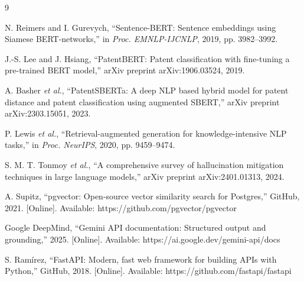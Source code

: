 \documentclass[journal]{IEEEtran}
\begin{document}
\begin{thebibliography}{9}

N. Reimers and I. Gurevych, ``Sentence-BERT: Sentence embeddings using Siamese BERT-networks,'' in \emph{Proc. EMNLP-IJCNLP}, 2019, pp. 3982--3992.

J.-S. Lee and J. Hsiang, ``PatentBERT: Patent classification with fine-tuning a pre-trained BERT model,'' arXiv preprint arXiv:1906.03524, 2019.

A. Basher \emph{et al.}, ``PatentSBERTa: A deep NLP based hybrid model for patent distance and patent classification using augmented SBERT,'' arXiv preprint arXiv:2303.15051, 2023.

P. Lewis \emph{et al.}, ``Retrieval-augmented generation for knowledge-intensive NLP tasks,'' in \emph{Proc. NeurIPS}, 2020, pp. 9459--9474.

S. M. T. Tonmoy \emph{et al.}, ``A comprehensive survey of hallucination mitigation techniques in large language models,'' arXiv preprint arXiv:2401.01313, 2024.

A. Supitz, ``pgvector: Open-source vector similarity search for Postgres,'' GitHub, 2021. [Online]. Available: https://github.com/pgvector/pgvector

Google DeepMind, ``Gemini API documentation: Structured output and grounding,'' 2025. [Online]. Available: https://ai.google.dev/gemini-api/docs

S. Ramírez, ``FastAPI: Modern, fast web framework for building APIs with Python,'' GitHub, 2018. [Online]. Available: https://github.com/fastapi/fastapi

\end{thebibliography}
\end{document}
